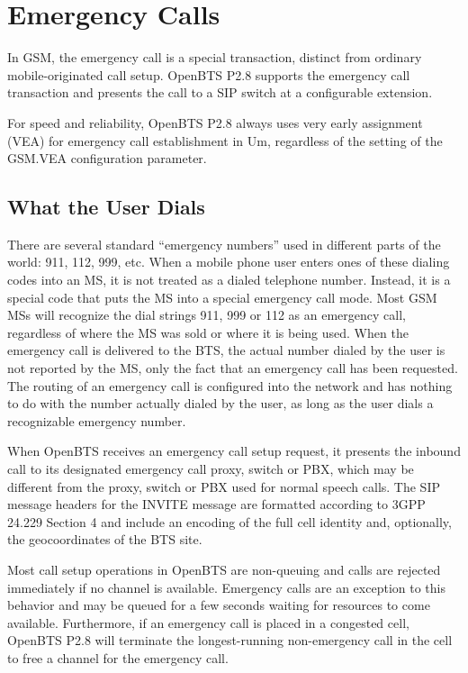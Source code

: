 \documentclass[11pt,openany]{book}
\begin{document}
\section{Emergency Calls}
\label{sec:emergency}
In GSM, the emergency call is a special transaction, distinct from ordinary mobile-originated call setup.
OpenBTS P2.8 supports the emergency call transaction and presents the call to a SIP switch at a configurable extension.

For speed and reliability, OpenBTS P2.8 always uses very early assignment (VEA) for emergency call establishment in Um, regardless of the setting of the GSM.VEA configuration parameter.

\subsection{What the User Dials}
There are several standard ``emergency numbers'' used in different parts of the world: 911, 112, 999, etc.  When a mobile phone user enters ones of these dialing codes into an MS, it is not treated as a dialed telephone number.  Instead, it is a special code that puts the MS into a special emergency call mode.  Most GSM MSs will recognize the dial strings 911, 999 or 112 as an emergency call, regardless of where the MS was sold or where it is being used.  When the emergency call is delivered to the BTS, the actual number dialed by the user is not reported by the MS, only the fact that an emergency call has been requested.  The routing of an emergency call is configured into the network and has nothing to do with the number actually dialed by the user, as long as the user dials a recognizable emergency number.

When OpenBTS receives an emergency call setup request, it presents the inbound call to its designated emergency call proxy, switch or PBX, which may be different from the proxy, switch or PBX used for normal speech calls.  The SIP message headers for the INVITE message are formatted according to 3GPP 24.229 Section 4 and include an encoding of the full cell identity and, optionally, the geocoordinates of the BTS site.

Most call setup operations in OpenBTS are non-queuing and calls are rejected immediately if no channel is available.  Emergency calls are an exception to this behavior and may be queued for a few seconds waiting for resources to come available.  Furthermore, if an emergency call is placed in a congested cell, OpenBTS P2.8 will terminate the longest-running non-emergency call in the cell to free a channel for the emergency call.
\end{document}
